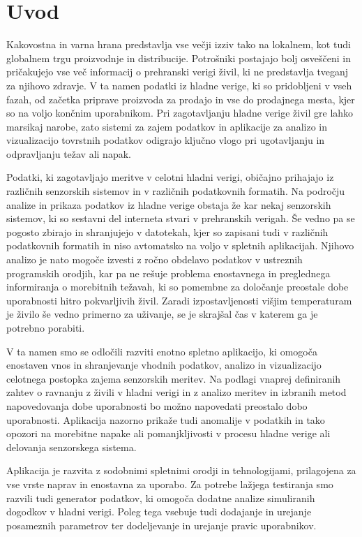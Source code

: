 \documentclass[a4paper, 12pt]{book}
\begin{document}
\chapter{Uvod}
Kakovostna in varna hrana predstavlja vse večji izziv tako na lokalnem, kot tudi globalnem trgu proizvodnje in distribucije. Potrošniki postajajo bolj osveščeni in pričakujejo vse več informacij o prehranski verigi živil, ki ne predstavlja tveganj za njihovo zdravje. V ta namen podatki iz hladne verige, ki so pridobljeni v vseh fazah, od začetka priprave proizvoda za prodajo in vse do prodajnega mesta, kjer so na voljo končnim uporabnikom. Pri zagotavljanju hladne verige živil gre lahko marsikaj narobe, zato sistemi za zajem podatkov in aplikacije za analizo in vizualizacijo tovrstnih podatkov odigrajo ključno vlogo pri ugotavljanju in odpravljanju težav ali napak. 

Podatki, ki zagotavljajo meritve v celotni hladni verigi, običajno prihajajo iz različnih senzorskih sistemov in v različnih podatkovnih formatih. Na področju analize in prikaza podatkov iz hladne verige obstaja že kar nekaj senzorskih sistemov, ki so sestavni del interneta stvari v prehranskih verigah. Še vedno pa se pogosto zbirajo in shranjujejo v datotekah, kjer so zapisani tudi v različnih podatkovnih formatih in  niso avtomatsko na voljo v spletnih aplikacijah. Njihovo analizo je nato mogoče izvesti z ročno obdelavo podatkov v ustreznih programskih orodjih, kar pa ne rešuje problema enostavnega in preglednega informiranja o morebitnih težavah, ki so pomembne za določanje preostale dobe uporabnosti hitro pokvarljivih živil. Zaradi izpostavljenosti višjim temperaturam je živilo še vedno primerno za uživanje, se je skrajšal čas v katerem ga je potrebno porabiti. 

V ta namen smo se odločili razviti enotno spletno aplikacijo, ki omogoča enostaven vnos in shranjevanje vhodnih podatkov, analizo in vizualizacijo celotnega postopka zajema senzorskih meritev. Na podlagi vnaprej definiranih zahtev o ravnanju z živili v hladni verigi in z analizo meritev in izbranih metod napovedovanja dobe uporabnosti  bo možno napovedati preostalo dobo uporabnosti. Aplikacija nazorno prikaže tudi anomalije v podatkih in tako opozori na morebitne napake ali pomanjkljivosti v procesu hladne verige ali delovanja senzorskega sistema.

Aplikacija je razvita z sodobnimi spletnimi orodji in tehnologijami, prilagojena za vse vrste naprav in enostavna za uporabo. Za potrebe lažjega testiranja smo razvili tudi generator podatkov, ki omogoča dodatne analize simuliranih dogodkov v hladni verigi. Poleg tega vsebuje tudi dodajanje in urejanje posameznih parametrov ter dodeljevanje in urejanje pravic uporabnikov.
\end{document}
